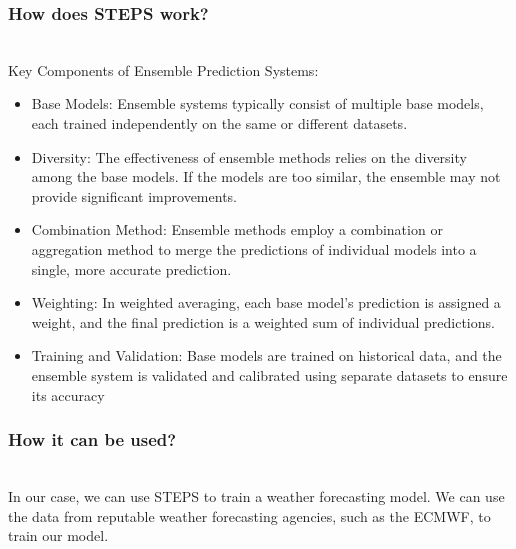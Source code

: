 \documentclass[../paper.tex]{subfiles}
\begin{document}
    \subsubsection{How does STEPS work?}
        \hfill\\
        Key Components of Ensemble Prediction Systems:
        \begin{itemize}
            \item Base Models: Ensemble systems typically consist of multiple base models,
            each trained independently on the same or different datasets.

            \item Diversity: The effectiveness of ensemble methods relies on the diversity among the base models.
            If the models are too similar, the ensemble may not provide significant improvements.

            \item Combination Method:
            Ensemble methods employ a combination or aggregation method
            to merge the predictions of individual models into a single,
            more accurate prediction.

            \item Weighting: In weighted averaging, each base model's prediction is assigned a weight,
            and the final prediction is a weighted sum of individual predictions.

            \item Training and Validation: Base models are trained on historical data,
            and the ensemble system is validated and calibrated
            using separate datasets to ensure its accuracy
        \end{itemize}

    \subsubsection{How it can be used?}
        \hfill\\
        In our case, we can use STEPS to train a weather forecasting model.
        We can use the data from reputable weather forecasting agencies, such as the ECMWF, to train our model.
\end{document}
